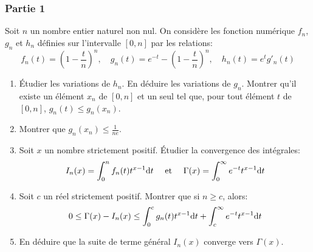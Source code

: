 \documentclass{article}
\def \de {{\rm d}}
\begin{document}
\subsubsection*{Partie 1}
Soit $n$ un nombre entier naturel non nul. On considère les fonction numérique $f_n$, $g_n$ et $h_n$ définies sur l'intervalle $[0,n]$ par les relations:
\[f_n(t)=(1-\frac tn)^n,\quad g_n(t)=e^{-t}-(1-\frac tn)^n,\quad h_n(t)=e^tg'_n(t)\] 
\begin{enumerate}
\item Étudier les variations de $h_n$. En déduire les variations de $g_n$. Montrer qu'il existe un élément $x_n$ de $[0,n]$ et un seul tel que, pour tout élément $t$ de $[0,n]$, $g_n(t)\leq g_n(x_n)$.
\item Montrer que $g_n(x_n)\leq \frac{1}{ne}$.
\item Soit $x$ un nombre strictement positif. Étudier la convergence des intégrales:
\[I_n(x)=\int_0^nf_n(t)t^{x-1}\de t\quad\mbox{ et }\quad \Gamma(x)=\int_0^\infty e^{-t}t^{x-1}\de t\]
\item Soit $c$ un réel strictement positif. Montrer que si $n\geq c$, alors:
\[0\leq \Gamma(x) - I_n(x)\leq \int_0^cg_n(t)t^{x-1}\de t +\int_c^\infty e^{-t}t^{x-1}\de t\]
\item En déduire que la suite de terme général $I_n(x)$ converge vers $\Gamma(x)$.
\end{enumerate}
\end{document}
